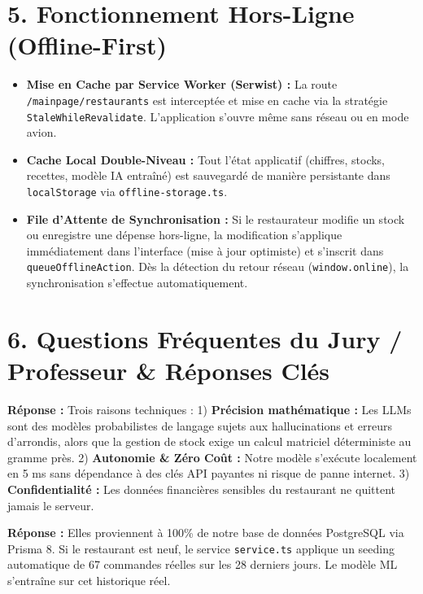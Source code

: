 \documentclass[10pt,a4paper]{article}
\begin{document}
\section*{\textcolor{restivored}{5. Fonctionnement Hors-Ligne (Offline-First)}}
\begin{itemize}[leftmargin=*,itemsep=1pt]
    \item \textbf{Mise en Cache par Service Worker (Serwist) :} La route \texttt{/mainpage/restaurants} est interceptée et mise en cache via la stratégie \texttt{StaleWhileRevalidate}. L'application s'ouvre même sans réseau ou en mode avion.
    \item \textbf{Cache Local Double-Niveau :} Tout l'état applicatif (chiffres, stocks, recettes, modèle IA entraîné) est sauvegardé de manière persistante dans \texttt{localStorage} via \texttt{offline-storage.ts}.
    \item \textbf{File d'Attente de Synchronisation :} Si le restaurateur modifie un stock ou enregistre une dépense hors-ligne, la modification s'applique immédiatement dans l'interface (mise à jour optimiste) et s'inscrit dans \texttt{queueOfflineAction}. Dès la détection du retour réseau (\texttt{window.online}), la synchronisation s'effectue automatiquement.
\end{itemize}

\section*{\textcolor{restivored}{6. Questions Fréquentes du Jury / Professeur \& Réponses Clés}}

\begin{subtlebox}
\textbf{Réponse :} Trois raisons techniques :
1) \textbf{Précision mathématique :} Les LLMs sont des modèles probabilistes de langage sujets aux hallucinations et erreurs d'arrondis, alors que la gestion de stock exige un calcul matriciel déterministe au gramme près.
2) \textbf{Autonomie \& Zéro Coût :} Notre modèle s'exécute localement en 5 ms sans dépendance à des clés API payantes ni risque de panne internet.
3) \textbf{Confidentialité :} Les données financières sensibles du restaurant ne quittent jamais le serveur.
\end{subtlebox}

\begin{subtlebox}
\textbf{Réponse :} Elles proviennent à 100\% de notre base de données PostgreSQL via Prisma 8. Si le restaurant est neuf, le service \texttt{service.ts} applique un seeding automatique de 67 commandes réelles sur les 28 derniers jours. Le modèle ML s'entraîne sur cet historique réel.
\end{subtlebox}
\end{document}
